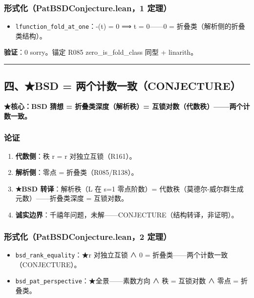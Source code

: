 \documentclass[
]{article}
\providecommand{\tightlist}{%
 \setlength{\itemsep}{0pt}\setlength{\parskip}{0pt}}
\begin{document}
\subsubsection{形式化（PatBSDConjecture.lean，1
定理）}\label{ux5f62ux5f0fux5316patbsdconjecture.lean1-ux5b9aux7406-2}

\begin{itemize}
\tightlist
\item
 \texttt{lfunction\_fold\_at\_one}：-(t) = 0 ⟹ t = 0------0 =
 折叠类（解析侧的折叠类结构）。
\end{itemize}

\textbf{验证}：0 sorry。锚定 R085 zero\_is\_fold\_class 同型 +
linarith。

\begin{center}\rule{0.5\linewidth}{0.5pt}\end{center}

\subsection{四、★BSD =
两个计数一致（CONJECTURE）}\label{ux56dbbsd-ux4e24ux4e2aux8ba1ux6570ux4e00ux81f4conjecture}

\textbf{★核心：BSD 猜想 = 折叠类深度（解析秩）=
互锁对数（代数秩）------两个计数一致。}

\subsubsection{论证}\label{ux8bbaux8bc1-3}

\begin{enumerate}
\def\labelenumi{\arabic{enumi}.}
\tightlist
\item
 \textbf{代数侧}：秩 r = r 对独立互锁（R161）。
\item
 \textbf{解析侧}：零点 = 折叠类（R085/R138）。
\item
 \textbf{★BSD 转译}：解析秩（L 在 s=1 零点阶数）=
 代数秩（莫德尔-威尔群生成元数）------折叠类深度 = 互锁对数。
\item
 \textbf{诚实边界}：千禧年问题，未解------CONJECTURE（结构转译，非证明）。
\end{enumerate}

\subsubsection{形式化（PatBSDConjecture.lean，2
定理）}\label{ux5f62ux5f0fux5316patbsdconjecture.lean2-ux5b9aux7406}

\begin{itemize}
\tightlist
\item
 \texttt{bsd\_rank\_equality}：★r 对独立互锁 ∧ 0 =
 折叠类------两个计数一致（CONJECTURE）。
\item
 \texttt{bsd\_pat\_perspective}：★全景------素数方向 ∧ 秩 = 互锁对数 ∧
 零点 = 折叠类。
\end{itemize}
\end{document}
